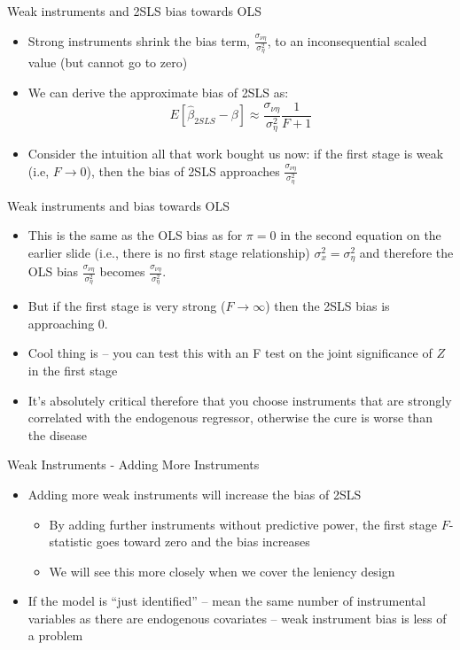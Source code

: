 \documentclass{beamer}
\begin{document}
\begin{frame}{Weak instruments and 2SLS bias towards OLS}
	
	\begin{itemize}
	\item Strong instruments shrink the bias term, $\frac{\sigma_{\nu \eta}}{\sigma^2_\eta}$, to an inconsequential scaled value (but cannot go to zero)
	\item We can derive the approximate bias of 2SLS as:$$E[\widehat{\beta}_{2SLS} - \beta] \approx \frac{\sigma_{\nu \eta}}{\sigma^2_\eta} \frac{1}{F+1}$$
	\item Consider the intuition all that work bought us now: if the first stage is weak (i.e, $F\rightarrow{0}$), then the bias of 2SLS approaches $\frac{\sigma_{\nu \eta}}{\sigma^2_\eta}$
	\end{itemize}
\end{frame}

\begin{frame}{Weak instruments and bias towards OLS}

\begin{itemize}
	\item This is the same as the OLS bias as for $\pi=0$ in the second equation on the earlier slide (i.e., there is no first stage relationship) $\sigma^2_x = \sigma^2_\eta$ and therefore the OLS bias $\frac{\sigma_{\nu \eta}}{\sigma^2_\eta}$ becomes $\frac{\sigma_{\nu \eta}}{\sigma^2_\eta}$.
	\item But if the first stage is very strong ($F\rightarrow{\infty}$) then the 2SLS bias is approaching 0.
	\item Cool thing is -- you can test this with an F test on the joint significance of $Z$ in the first stage
	\item It's absolutely critical therefore that you choose instruments that are strongly correlated with the endogenous regressor, otherwise the cure is worse than the disease
\end{itemize}

\end{frame}

\begin{frame}{Weak Instruments - Adding More Instruments}
	
	\begin{itemize}
	\item Adding more weak instruments will increase the bias of 2SLS
		\begin{itemize}
		\item By adding further instruments without predictive power, the first stage $F$-statistic goes toward zero and the bias increases
		\item We will see this more closely when we cover the leniency design
		\end{itemize}
	\item If the model is ``just identified'' -- mean the same number of instrumental variables as there are endogenous covariates -- weak instrument bias is less of a problem
	\end{itemize}
\end{frame}
\end{document}

